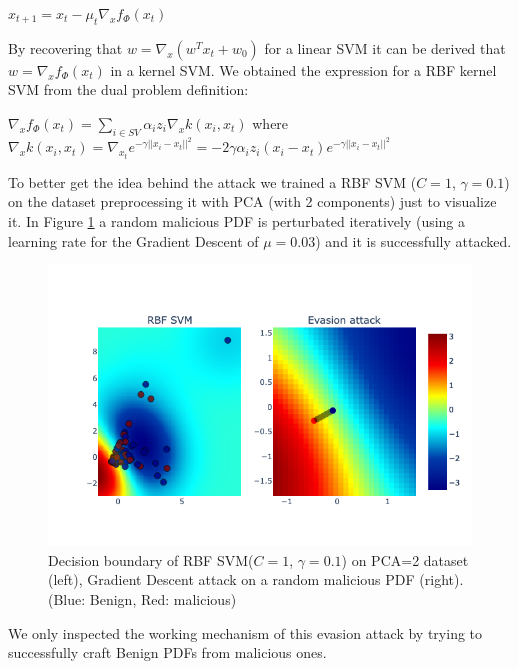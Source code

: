 \documentclass[twocolumn, switch]{article} %
\newcommand\x{0.7}
\begin{document}
\begin{center}
	$x_{t+1} = x_t - \mu_t\nabla_xf_{\Phi}(x_t)$
\end{center}
By recovering that $w = \nabla_x(w^Tx_t+w_0)$ for a linear SVM it can be derived that $w = \nabla_xf_{\Phi}(x_t)$ in a kernel SVM.
We obtained the expression for a RBF kernel SVM from the dual problem definition:
\begin{center}
	$\nabla_xf_{\Phi}(x_t) = \sum_{i \in SV}^{}\alpha_iz_i\nabla_xk(x_i,x_t)$
	where $\nabla_xk(x_i,x_t) = \nabla_{x_t}e^{-\gamma||x_i-x_t||^2}=-2\gamma\alpha_i z_i(x_i - x_t)e^{-\gamma||x_i-x_t||^2}$
\end{center}
To better get the idea behind the attack we trained a RBF SVM ($C=1$, $\gamma=0.1$) on the dataset preprocessing it with PCA (with 2 components) just to visualize it. In Figure \ref{fig:svmattack} a random malicious PDF is perturbated iteratively (using a learning rate for the Gradient Descent of $\mu=0.03$) and it is successfully attacked.
\begin{figure}[ht!]
	\centering
	\includegraphics[width=\x\linewidth]{svmattack.png}
	\caption{Decision boundary of RBF SVM($C=1$, $\gamma=0.1$) on PCA=2 dataset (left), Gradient Descent attack on a random malicious PDF (right). (Blue: Benign, Red: malicious)}
	\label{fig:svmattack}
\end{figure}
We only inspected the working mechanism of this evasion attack by trying to successfully craft Benign PDFs from malicious ones.
\end{document}
